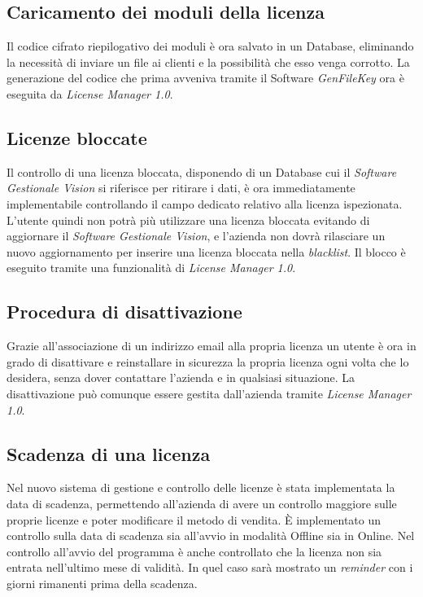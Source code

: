 \subsection{Caricamento dei moduli della licenza}

Il codice cifrato riepilogativo dei moduli è ora salvato in un Database, eliminando la necessità di inviare un file ai clienti e la possibilità che esso venga corrotto. La generazione del codice che prima avveniva tramite il Software \textit{GenFileKey} ora è eseguita da \textit{License Manager 1.0}.

\subsection{Licenze bloccate} 
Il controllo di una licenza bloccata, disponendo di un Database cui il \textit{Software Gestionale Vision} si riferisce per ritirare i dati, è ora immediatamente implementabile controllando il campo dedicato relativo alla licenza ispezionata. L'utente quindi non potrà più utilizzare una licenza bloccata evitando di aggiornare il \textit{Software Gestionale Vision}, e l'azienda non dovrà rilasciare un nuovo aggiornamento per inserire una licenza bloccata nella \textit{blacklist}.
Il blocco è eseguito tramite una funzionalità di \textit{License Manager 1.0}.

\subsection{Procedura di disattivazione}

Grazie all'associazione di un indirizzo email alla propria licenza un utente è ora in grado di disattivare e reinstallare in sicurezza la propria licenza ogni volta che lo desidera, senza dover contattare l’azienda e in qualsiasi situazione. La disattivazione può comunque essere gestita dall'azienda tramite \textit{License Manager 1.0}.

\subsection{Scadenza di una licenza}

Nel nuovo sistema di gestione e controllo delle licenze è stata implementata la data di scadenza, permettendo all'azienda di avere un controllo maggiore sulle proprie licenze e poter modificare il metodo di vendita. È implementato un controllo sulla data di scadenza sia all'avvio in modalità Offline sia in Online. Nel controllo all’avvio del programma è anche controllato che la licenza non sia entrata nell’ultimo mese di validità. In quel caso sarà mostrato un \textit{reminder} con i giorni rimanenti prima della scadenza. 
 
